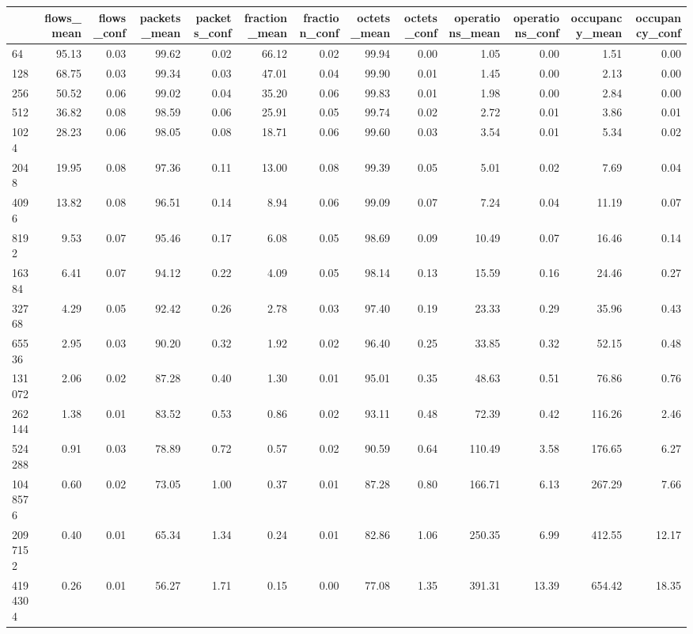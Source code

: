 \begin{tabular}{lrrrrrrrrrrrr}
\toprule
 & flows_mean & flows_conf & packets_mean & packets_conf & fraction_mean & fraction_conf & octets_mean & octets_conf & operations_mean & operations_conf & occupancy_mean & occupancy_conf \\
\midrule
64 & 95.13 & 0.03 & 99.62 & 0.02 & 66.12 & 0.02 & 99.94 & 0.00 & 1.05 & 0.00 & 1.51 & 0.00 \\
128 & 68.75 & 0.03 & 99.34 & 0.03 & 47.01 & 0.04 & 99.90 & 0.01 & 1.45 & 0.00 & 2.13 & 0.00 \\
256 & 50.52 & 0.06 & 99.02 & 0.04 & 35.20 & 0.06 & 99.83 & 0.01 & 1.98 & 0.00 & 2.84 & 0.00 \\
512 & 36.82 & 0.08 & 98.59 & 0.06 & 25.91 & 0.05 & 99.74 & 0.02 & 2.72 & 0.01 & 3.86 & 0.01 \\
1024 & 28.23 & 0.06 & 98.05 & 0.08 & 18.71 & 0.06 & 99.60 & 0.03 & 3.54 & 0.01 & 5.34 & 0.02 \\
2048 & 19.95 & 0.08 & 97.36 & 0.11 & 13.00 & 0.08 & 99.39 & 0.05 & 5.01 & 0.02 & 7.69 & 0.04 \\
4096 & 13.82 & 0.08 & 96.51 & 0.14 & 8.94 & 0.06 & 99.09 & 0.07 & 7.24 & 0.04 & 11.19 & 0.07 \\
8192 & 9.53 & 0.07 & 95.46 & 0.17 & 6.08 & 0.05 & 98.69 & 0.09 & 10.49 & 0.07 & 16.46 & 0.14 \\
16384 & 6.41 & 0.07 & 94.12 & 0.22 & 4.09 & 0.05 & 98.14 & 0.13 & 15.59 & 0.16 & 24.46 & 0.27 \\
32768 & 4.29 & 0.05 & 92.42 & 0.26 & 2.78 & 0.03 & 97.40 & 0.19 & 23.33 & 0.29 & 35.96 & 0.43 \\
65536 & 2.95 & 0.03 & 90.20 & 0.32 & 1.92 & 0.02 & 96.40 & 0.25 & 33.85 & 0.32 & 52.15 & 0.48 \\
131072 & 2.06 & 0.02 & 87.28 & 0.40 & 1.30 & 0.01 & 95.01 & 0.35 & 48.63 & 0.51 & 76.86 & 0.76 \\
262144 & 1.38 & 0.01 & 83.52 & 0.53 & 0.86 & 0.02 & 93.11 & 0.48 & 72.39 & 0.42 & 116.26 & 2.46 \\
524288 & 0.91 & 0.03 & 78.89 & 0.72 & 0.57 & 0.02 & 90.59 & 0.64 & 110.49 & 3.58 & 176.65 & 6.27 \\
1048576 & 0.60 & 0.02 & 73.05 & 1.00 & 0.37 & 0.01 & 87.28 & 0.80 & 166.71 & 6.13 & 267.29 & 7.66 \\
2097152 & 0.40 & 0.01 & 65.34 & 1.34 & 0.24 & 0.01 & 82.86 & 1.06 & 250.35 & 6.99 & 412.55 & 12.17 \\
4194304 & 0.26 & 0.01 & 56.27 & 1.71 & 0.15 & 0.00 & 77.08 & 1.35 & 391.31 & 13.39 & 654.42 & 18.35 \\

\end{tabular}
